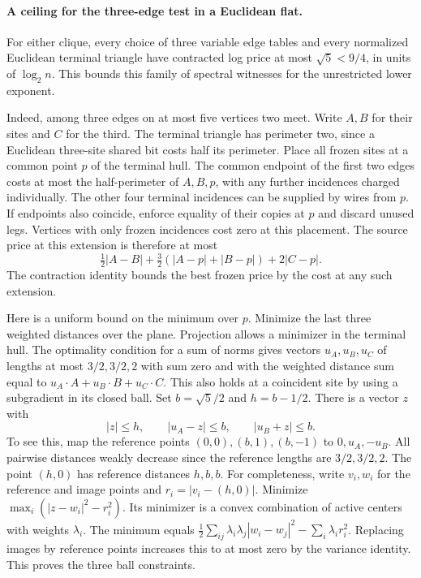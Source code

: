 \documentclass[11pt,letterpaper]{article}
\begin{document}
\paragraph{A ceiling for the three-edge test in a Euclidean flat.}
For either clique, every choice of three variable edge tables and every
normalized Euclidean terminal triangle have contracted log price at most
\(\sqrt5<9/4\), in units of \(\log_2 n\). This bounds this family of
spectral witnesses for the unrestricted lower exponent.

Indeed, among three edges on at most five vertices two meet. Write \(A,B\)
for their sites and \(C\) for the third. The terminal triangle has perimeter
two, since a Euclidean three-site shared bit costs half its perimeter.
Place all frozen sites at a common point \(p\) of the terminal hull.
The common endpoint of the first two edges costs at most the half-perimeter
of \(A,B,p\), with any further incidences charged individually. The other
four terminal incidences can be supplied by wires from \(p\). If endpoints
also coincide, enforce equality of their copies at \(p\) and discard unused
legs. Vertices with only frozen incidences cost zero at this placement.
The source price at this extension is therefore at most
\[
 \tfrac12|A-B|+\tfrac32(|A-p|+|B-p|)+2|C-p| .
\]
The contraction identity bounds the best frozen price by the cost at any
such extension.

Here is a uniform bound on the minimum over \(p\). Minimize the last three
weighted distances over the plane. Projection allows a minimizer in the
terminal hull. The optimality condition for a sum of norms gives vectors
\(u_A,u_B,u_C\) of lengths at most \(3/2,3/2,2\) with sum zero and with
the weighted distance sum equal to \(u_A\cdot A+u_B\cdot B+u_C\cdot C\).
This also holds at a coincident site by using a subgradient in its closed
ball. Set \(b=\sqrt5/2\) and \(h=b-1/2\). There is a vector \(z\) with
\[
 |z|\le h,\qquad |u_A-z|\le b,\qquad |u_B+z|\le b .
\]
To see this, map the reference points \((0,0),(b,1),(b,-1)\) to
\(0,u_A,-u_B\). All pairwise distances weakly decrease since the reference
lengths are \(3/2,3/2,2\). The point \((h,0)\) has reference distances
\(h,b,b\). For completeness, write \(v_i,w_i\) for the reference and
image points and \(r_i=|v_i-(h,0)|\). Minimize
\(\max_i(|z-w_i|^2-r_i^2)\). Its minimizer is a convex combination of active
centers with weights \(\lambda_i\). The minimum equals
\(\frac12\sum_{ij}\lambda_i\lambda_j|w_i-w_j|^2-\sum_i\lambda_i r_i^2\).
Replacing images by reference points increases this to at most zero by the
variance identity. This proves the three ball constraints.
\end{document}
